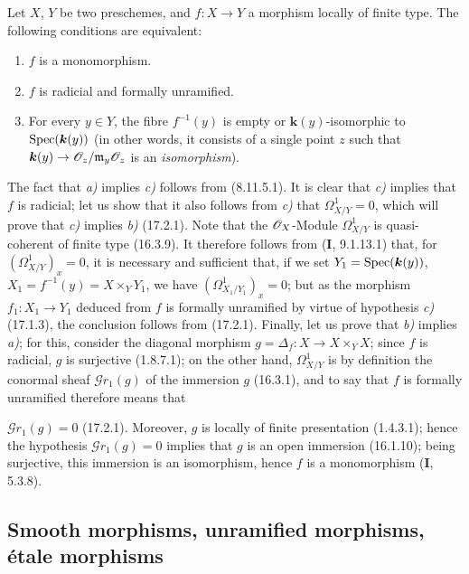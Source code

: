\begin{proposition}[17.2.6]
\label{IV.17.2.6}
Let $X$, $Y$ be two preschemes, and $f:X\to Y$ a morphism locally of finite type. The following conditions are equivalent:
\begin{enumerate}
  \item[\textup{a)}] $f$ is a monomorphism.
  \item[\textup{b)}] $f$ is radicial and formally unramified.
  \item[\textup{c)}] For every $y\in Y$, the fibre $f^{-1}(y)$ is empty or $\boldsymbol{k}(y)$-isomorphic to $\operatorname{Spec}(\boldsymbol{k}(y))$ \textup{(in other words, it consists of a single point $z$ such that $\boldsymbol{k}(y)\to\mathscr{O}_z/\mathfrak{m}_y\mathscr{O}_z$ is an \emph{isomorphism})}.
\end{enumerate}
\end{proposition}

The fact that \emph{a)} implies \emph{c)} follows from (8.11.5.1). It is clear that \emph{c)} implies that $f$ is radicial; let us show that it also follows from \emph{c)} that $\varOmega_{X/Y}^1=0$, which will prove that \emph{c)} implies \emph{b)} (17.2.1). Note that the $\mathscr{O}_X$-Module $\varOmega_{X/Y}^1$ is quasi-coherent of finite type (16.3.9). It therefore follows from (\textbf{I}, 9.1.13.1) that, for $(\varOmega_{X/Y}^1)_x=0$, it is necessary and sufficient that, if we set $Y_1=\operatorname{Spec}(\boldsymbol{k}(y))$, $X_1=f^{-1}(y)=X\times_Y Y_1$, we have $(\varOmega_{X_1/Y_1}^1)_x=0$; but as the morphism $f_1:X_1\to Y_1$ deduced from $f$ is formally unramified by virtue of hypothesis \emph{c)} (17.1.3), the conclusion follows from (17.2.1). Finally, let us prove that \emph{b)} implies \emph{a)}; for this, consider the diagonal morphism $g=\Delta_f:X\to X\times_Y X$; since $f$ is radicial, $g$ is surjective (1.8.7.1); on the other hand, $\varOmega_{X/Y}^1$ is by definition the conormal sheaf $\mathscr{G}r_1(g)$ of the immersion $g$ (16.3.1), and to say that $f$ is formally unramified therefore means that

$\mathscr{G}r_1(g)=0$ (17.2.1). Moreover, $g$ is locally of finite presentation (1.4.3.1); hence the hypothesis $\mathscr{G}r_1(g)=0$ implies that $g$ is an open immersion (16.1.10); being surjective, this immersion is an isomorphism, hence $f$ is a monomorphism (\textbf{I}, 5.3.8).

\subsection{Smooth morphisms, unramified morphisms, étale morphisms}

